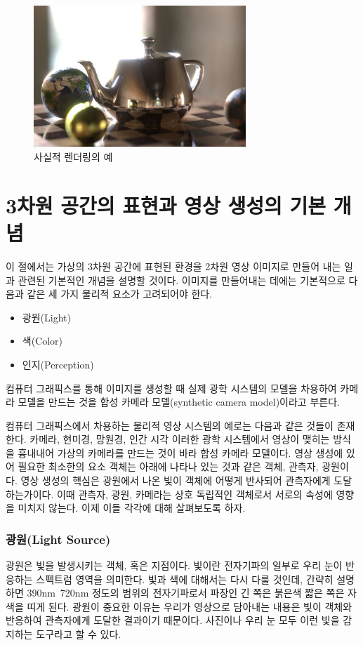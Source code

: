 \begin{figure}[h!]
  \centering
    \includegraphics[width=8cm]{OGL_intro/photorealisticTeapot.jpg}
    \caption{사실적 렌더링의 예}
    \label{fig:OGL_intro:photorealisticTeapot}
\end{figure}

\section{3차원 공간의 표현과 영상 생성의 기본 개념}

이 절에서는 가상의 3차원 공간에 표현된 환경을 2차원 영상 이미지로 만들어 내는 일과 관련된 기본적인 개념을 설명할 것이다. 이미지를 만들어내는 데에는 기본적으로 다음과 같은 세 가지 물리적 요소가 고려되어야 한다.

\begin{itemize}
\item 광원(Light)
\item 색(Color)
\item 인지(Perception)
\end{itemize}

컴퓨터 그래픽스를 통해 이미지를 생성할 때 실제 광학 시스템의 모델을 차용하여 카메라 모델을 만드는 것을 합성 카메라 모델(synthetic camera model)이라고 부른다. 

컴퓨터 그래픽스에서 차용하는 물리적 영상 시스템의 예로는 다음과 같은 것들이 존재한다.
카메라, 현미경, 망원경, 인간 시각
이러한 광학 시스템에서 영상이 맺히는 방식을 흉내내어 가상의 카메라를 만드는 것이 바라 합성 카메라 모델이다.
영상 생성에 있어 필요한 최소한의 요소 객체는 아래에 나타나 있는 것과 같은 객체, 관측자, 광원이다.
영상 생성의 핵심은 광원에서 나온 빛이 객체에 어떻게 반사되어 관측자에게 도달하는가이다. 
이때 관측자, 광원, 카메라는 상호 독립적인 객체로서 서로의 속성에 영향을 미치지 않는다. 이제 이들 각각에 대해 살펴보도록 하자.

\subsubsection{광원(Light Source)}
광원은 빛을 발생시키는 객체, 혹은 지점이다. 빛이란 전자기파의 일부로 우리 눈이 반응하는 스펙트럼 영역을 의미한다. 빛과 색에 대해서는 다시 다룰 것인데, 간략히 설명하면 390nm~720nm 정도의 범위의 전자기파로서 파장인 긴 쪽은 붉은색 짧은 쪽은 자색을 띠게 된다.
광원이 중요한 이유는 우리가 영상으로 담아내는 내용은 빛이 객체와 반응하여 관측자에게 도달한 결과이기 때문이다. 사진이나 우리 눈 모두 이런 빛을 감지하는 도구라고 할 수 있다. 


